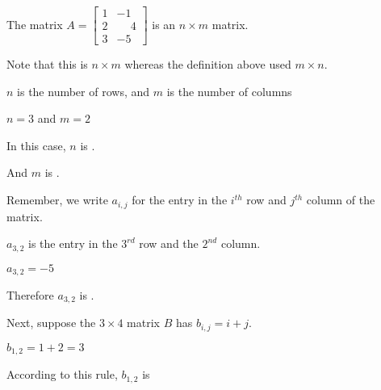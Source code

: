 \documentclass{ximera}
\begin{document}
\begin{question}
  The matrix $A = \begin{bmatrix}
    1&-1\\2&\phantom{-}4\\3&-5
  \end{bmatrix}$
  is an $n \times m$ matrix.  

  \begin{solution}
    \begin{hint}
      Note that this is $n \times m$ whereas the definition above used $m \times n$.
    \end{hint}
    \begin{hint}
    	$n$ is the number of rows, and $m$ is the number of columns 
    \end{hint}
    \begin{hint}
    	$n=3$  and $m=2$
    \end{hint}

    In this case, $n$ is .
  \end{solution}

  \begin{solution}
    And $m$ is .
  \end{solution}

  Remember, we write $a_{i,j}$ for the entry in the $i^{th}$ row and $j^{th}$ column of the matrix.


  \begin{solution}
  	\begin{hint}
  		$a_{3,2}$ is the entry in the $3^{rd}$ row and the $2^{nd}$ column.
  	\end{hint}
  	\begin{hint}
  		$a_{3,2} = -5$
  	\end{hint}
    Therefore $a_{3,2}$ is .
  \end{solution}

  Next, suppose the $3 \times 4$ matrix $B$ has $b_{i,j} = i+j$.

  \begin{solution}
   \begin{hint}
   		\begin{question}
   			\begin{solution}
   			\begin{hint}
   				$b_{1,2} = 1+2 = 3$
   			\end{hint}
   			According to this rule, $b_{1,2}$ is 
   			\end{solution} 
   		\end{question}
   		

\end{hint}
\end{solution}
\end{question}
\end{document}
